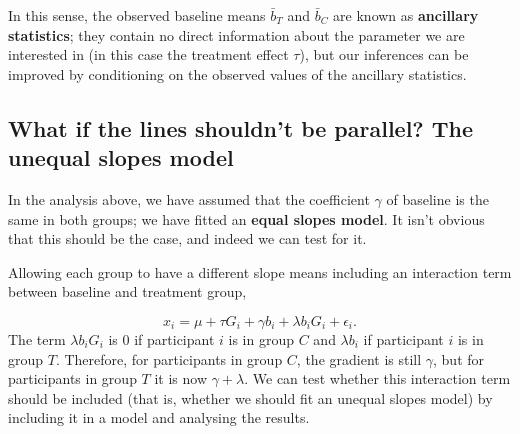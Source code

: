 \documentclass[
  openany]{book}
\theoremstyle{definition}
\theoremstyle{definition}
\theoremstyle{definition}
\theoremstyle{definition}
\theoremstyle{remark}
\begin{document}
In this sense, the observed baseline means \(\bar{b}_T\) and \(\bar{b}_C\) are known as \textbf{ancillary statistics}; they contain no direct information about the parameter we are interested in (in this case the treatment effect \(\tau\)), but our inferences can be improved by conditioning on the observed values of the ancillary statistics.

\subsection{What if the lines shouldn't be parallel? The unequal slopes model}\label{what-if-the-lines-shouldnt-be-parallel-the-unequal-slopes-model}

In the analysis above, we have assumed that the coefficient \(\gamma\) of baseline is the same in both groups; we have fitted an \textbf{equal slopes model}. It isn't obvious that this should be the case, and indeed we can test for it.

Allowing each group to have a different slope means including an interaction term between baseline and treatment group,

\[ x_i = \mu + \tau G_i+ \gamma b_i + \lambda b_i G_i + \epsilon_i . \]
The term \(\lambda b_i G_i\) is 0 if participant \(i\) is in group \(C\) and \(\lambda b_i\) if participant \(i\) is in group \(T\). Therefore, for participants in group \(C\), the gradient is still \(\gamma\), but for participants in group \(T\) it is now \(\gamma + \lambda\). We can test whether this interaction term should be included (that is, whether we should fit an unequal slopes model) by including it in a model and analysing the results.
\end{document}
